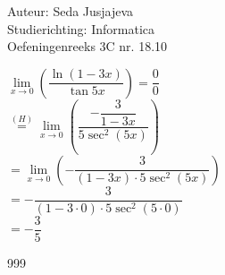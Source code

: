 \documentclass[a4paper]{article}
\newcommand{\limit}{\lim\limits}
\begin{document}
\noindent \large Auteur: Seda Jusjajeva\\
\noindent \large Studierichting: Informatica\\
\noindent \large Oefeningenreeks 3C nr. 18.10 \\

\medskip

\normalsize

$\limit_{x\to0} \left(\dfrac{\ln(1 - 3x)}{\tan5x}\right) = \dfrac{0}{0}$ \\

$\stackrel{(H)} = \limit_{x\to0}\left(\dfrac{-\dfrac{3}{1 - 3x}}{5\sec^2(5x)}\right)$ \\

$= \limit_{x\to0}\left(-\dfrac{3}{(1 - 3x)\cdot5\sec^2(5x)}\right)$ \\

$= -\dfrac{3}{(1 - 3 \cdot 0) \cdot 5 \sec^2 (5 \cdot 0)}$ \\

$= -\dfrac{3}{5}$ \\


\begin{thebibliography}{999}
\end{thebibliography}
\end{document}
